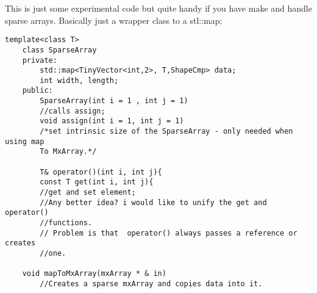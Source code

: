 \documentclass[a4paper,10pt]{article}
\begin{document}
	This is just some experimental code but quite handy if you have make 
	and handle sparse arrays. Basically just a wrapper class to a stl::map;
\begin{lstlisting}[caption = {Sparse array}]
    template<class T>
    class SparseArray
    private:
        std::map<TinyVector<int,2>, T,ShapeCmp> data;
        int width, length;
    public:
        SparseArray(int i = 1 , int j = 1)
	    //calls assign;
        void assign(int i = 1, int j = 1)
	    /*set intrinsic size of the SparseArray - only needed when using map
	    To MxArray.*/

    	T& operator()(int i, int j){
    	const T get(int i, int j){
	    //get and set element;
	    //Any better idea? i would like to unify the get and operator() 
	    //functions.
	    // Problem is that  operator() always passes a reference or creates 
	    //one.

	void mapToMxArray(mxArray * & in)
	    //Creates a sparse mxArray and copies data into it.
\end{lstlisting}
\end{document}
